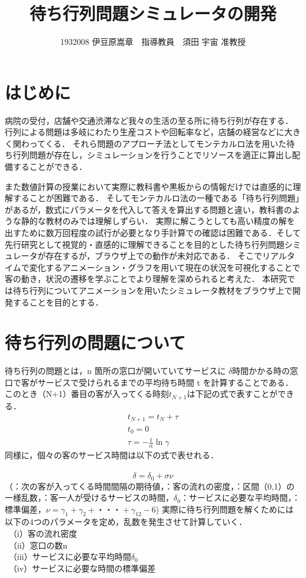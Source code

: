 \documentclass[twocolumn,10pt,a4j]{ltjsarticle}
\title{待ち行列問題シミュレータの開発}
\author{1932008 伊豆原嵩章　指導教員　須田 宇宙 准教授}
\date{}
\begin{document}
\maketitle

\section{はじめに}
病院の受付，店舗や交通渋滞など我々の生活の至る所に待ち行列が存在する．
行列による問題は多岐にわたり生産コストや回転率など，店舗の経営などに大きく関わってくる．
それら問題のアプローチ法としてモンテカルロ法を用いた待ち行列問題が存在し，シミュレーションを行うことでリソースを適正に算出し配備することができる．

また数値計算の授業において実際に教科書や黒板からの情報だけでは直感的に理解することが困難である．
そしてモンテカルロ法の一種である「待ち行列問題」があるが，数式にパラメータを代入して答えを算出する問題と違い，教科書のような静的な教材のみでは理解しずらい．
実際に解こうとしても高い精度の解を出すために数万回程度の試行が必要となり手計算での確認は困難である．そして先行研究として視覚的・直感的に理解できることを目的とした待ち行列問題シミュレータが存在するが，ブラウザ上での動作が未対応である．
そこでリアルタイムで変化するアニメーション・グラフを用いて現在の状況を可視化することで客の動き，状況の遷移を学ぶことでより理解を深められると考えた．
本研究では待ち行列についてアニメーションを用いたシミュレータ教材をブラウザ上で開発することを目的とする．

\section{待ち行列の問題について}
待ち行列の問題とは，n 箇所の窓口が開いていてサービスに $\delta$時間かかる時の窓口で客がサービスで受けられるまでの平均待ち時間 t を計算することである．
このとき（N+1）番目の客が入ってくる時刻$t_{N+1}$は下記の式で表すことができる．\\
\vspace{-11mm}
\begin{eqnarray}
t_{N+1}=t_N+\tau\\
t_0=0\\　
\tau=-\frac{1}{\alpha}\ln\gamma
\end{eqnarray}
同様に，個々の客のサービス時間は以下の式で表せれる．\\　
\vspace{-5mm}
\begin{equation}
\delta=\delta_0+\sigma\nu
\end{equation}
\vspace{-1mm}
（\tau：次の客が入ってくる時間間隔の期待値，\alpha：客の流れの密度，\gamma：区間（0,1）の一様乱数，\delta：客一人が受けるサービスの時間，$\delta_0$：サービスに必要な平均時間，\sigma：標準偏差，$\nu=\gamma_1+\gamma_2+・・・+\gamma_{12}-6$)
実際に待ち行列問題を解くためには以下の4つのパラメータを定め，乱数を発生させて計算していく．\\
　（i）客の流れ密度\alpha\\
　（ii）窓口の数n\\
　（iii）サービスに必要な平均時間$\delta_0$\\
　（iv）サービスに必要な時間の標準偏差\sigma\\
\end{document}
